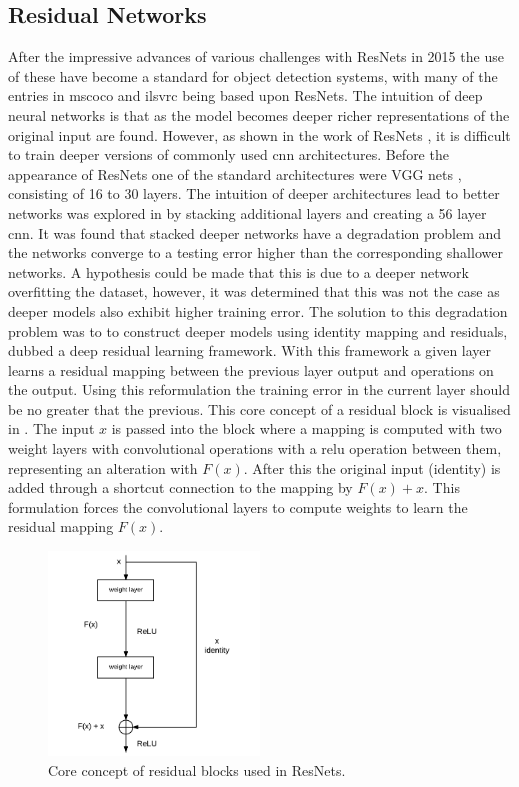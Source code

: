 \subsection{Residual Networks}
After the impressive advances of various challenges with ResNets in 2015 the use of these have become a standard for object detection systems, with many of the entries in \gls{mscoco} and \gls{ilsvrc} being based upon ResNets. The intuition of deep neural networks is that as the model becomes deeper richer representations of the original input are found. However, as shown in the work of ResNets \cite{deepres}, it is difficult to train deeper versions of commonly used \gls{cnn} architectures. Before the appearance of ResNets one of the standard architectures were VGG nets \cite{vgg16}, consisting of 16 to 30 layers. The intuition of deeper architectures lead to better networks was explored in \cite{deepres} by stacking additional layers and creating a 56 layer \gls{cnn}. It was found that stacked deeper networks have a degradation problem and the networks converge to a testing error higher than the corresponding shallower networks. A hypothesis could be made that this is due to a deeper network overfitting the dataset, however, it was determined that this was not the case as deeper models also exhibit higher training error. The solution to this degradation problem was to to construct deeper models using identity mapping and residuals, dubbed a deep residual learning framework. With this framework a given layer learns a residual mapping between the previous layer output and operations on the output. Using this reformulation the training error in the current layer should be no greater that the previous. This core concept of a residual block is visualised in . The input $x$ is passed into the block where a mapping is computed with two weight layers with convolutional operations with a \gls{relu} operation between them, representing an alteration with $F(x)$. After this the original input (identity) is added through a shortcut connection to the mapping by $F(x) + x$. This formulation forces the convolutional layers to compute weights to learn the residual mapping $F(x)$. 

\begin{figure}[H]
  \centering
    \includegraphics[width=0.5\textwidth]{Figs/Techanal/resblock.pdf}
    \caption{Core concept of residual blocks used in ResNets.}
    \label{fig:resblock}
\end{figure}

